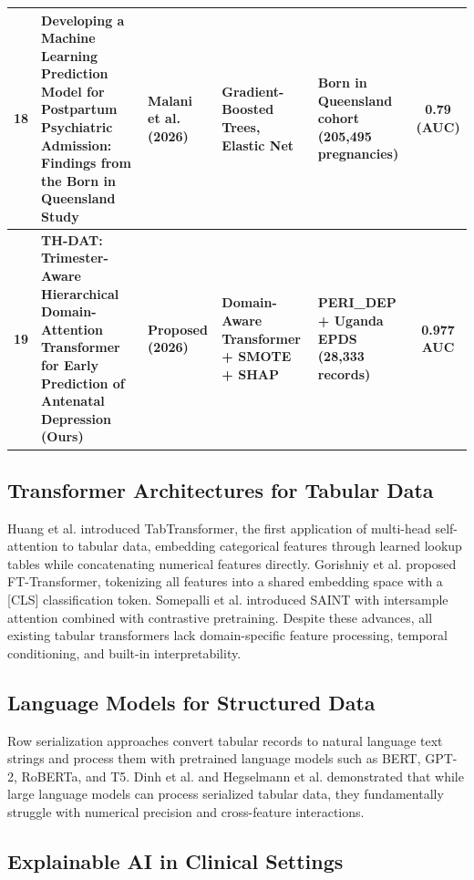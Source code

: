 \documentclass[12pt,a4paper]{article}
\begin{document}
\begin{table}[!htbp]
\begin{tabular}{|c|p{6.5cm}|p{2.2cm}|p{2.3cm}|p{2.5cm}|c|}
\hline
18 & Developing a Machine Learning Prediction Model for Postpartum Psychiatric Admission: Findings from the Born in Queensland Study & Malani et al. (2026) & Gradient-Boosted Trees, Elastic Net & Born in Queensland cohort (205,495 pregnancies) & 0.79 (AUC) \\
\hline
\textbf{19} & \textbf{TH-DAT: Trimester-Aware Hierarchical Domain-Attention Transformer for Early Prediction of Antenatal Depression (Ours)} & \textbf{Proposed (2026)} & \textbf{Domain-Aware Transformer + SMOTE + SHAP} & \textbf{PERI\_DEP + Uganda EPDS (28,333 records)} & \textbf{0.977 AUC} \\
\hline
\end{tabular}
\end{table}

\subsection{Transformer Architectures for Tabular Data}

Huang et al.\cite{huang2020tabtf} introduced TabTransformer, the first application of multi-head self-attention to tabular data, embedding categorical features through learned lookup tables while concatenating numerical features directly. Gorishniy et al.\cite{gorishniy2021} proposed FT-Transformer, tokenizing all features into a shared embedding space with a [CLS] classification token. Somepalli et al.\cite{somepalli2021} introduced SAINT with intersample attention combined with contrastive pretraining. Despite these advances, all existing tabular transformers lack domain-specific feature processing, temporal conditioning, and built-in interpretability.

\subsection{Language Models for Structured Data}

Row serialization approaches convert tabular records to natural language text strings and process them with pretrained language models such as BERT\cite{devlin2019}, GPT-2\cite{radford2019}, RoBERTa\cite{liu2019}, and T5\cite{raffel2020}. Dinh et al.\cite{dinh2022} and Hegselmann et al.\cite{hegselmann2023} demonstrated that while large language models can process serialized tabular data, they fundamentally struggle with numerical precision and cross-feature interactions.

\subsection{Explainable AI in Clinical Settings}
\end{document}
